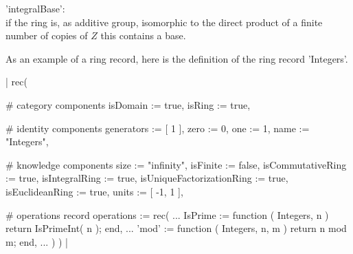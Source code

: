 'integralBase': \\
        if the ring is,  as  additive  group, isomorphic  to  the  direct
        product of a finite number of copies of $Z$ this contains a base.

As an example of a ring record, here is the definition of the ring record
'Integers'.

|    rec(

        # category components
        isDomain                    := true,
        isRing                      := true,

        # identity components
        generators                  := [ 1 ],
        zero                        := 0,
        one                         := 1,
        name                        := "Integers",

        # knowledge components
        size                        := "infinity",
        isFinite                    := false,
        isCommutativeRing           := true,
        isIntegralRing              := true,
        isUniqueFactorizationRing   := true,
        isEuclideanRing             := true,
        units                       := [ -1, 1 ],

        # operations record
        operations                  := rec(
            ...
            IsPrime                 := function ( Integers, n )
                return IsPrimeInt( n );
            end,
            ...
            'mod'                   := function ( Integers, n, m )
                return n mod m;
            end,
            ... ) ) |





